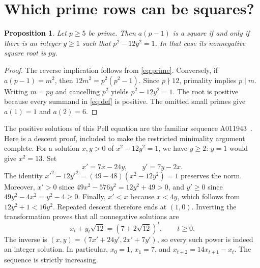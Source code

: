 \documentclass[11pt]{article}
\newtheorem{proposition}[theorem]{Proposition}
\begin{document}
\section{Which prime rows can be squares?}
\begin{proposition}\label{prop:criterion}
Let $p\geq5$ be prime. Then $a(p-1)$ is a square if and only if
there is an integer $y\geq1$ such that $p^2-12y^2=1$.
In that case its nonnegative square root is $py$.
\end{proposition}
\begin{proof}
The reverse implication follows from \eqref{eq:prime}.
Conversely, if $a(p-1)=m^2$, then
$12m^2=p^2(p^2-1)$. Since $p\nmid12$, primality implies $p\mid m$.
Writing $m=py$ and cancelling $p^2$ yields $p^2-12y^2=1$.
The root is positive because every summand in \eqref{eq:def} is
positive. The omitted small primes give $a(1)=1$ and $a(2)=6$.
\end{proof}

The positive solutions of this Pell equation are the familiar
sequence A011943~\cite{lloyd}. Here is a descent proof, included
to make the restricted minimality argument complete.
For a solution $x,y>0$ of $x^2-12y^2=1$, we have $y\geq2$:
$y=1$ would give $x^2=13$. Set
\[
 x'=7x-24y,\qquad y'=7y-2x.
\]
The identity $x'^2-12y'^2=(49-48)(x^2-12y^2)=1$ preserves the norm.
Moreover, $x'>0$ since
$49x^2-576y^2=12y^2+49>0$, and $y'\geq0$ since
$49y^2-4x^2=y^2-4\geq0$.
Finally, $x'<x$ because $x<4y$, which follows from
$12y^2+1<16y^2$. Repeated descent therefore ends at $(1,0)$.
Inverting the transformation proves that all nonnegative solutions are
\begin{equation}\label{eq:pell}
 x_t+y_t\sqrt{12}=(7+2\sqrt{12})^t,\qquad t\geq0.
\end{equation}
The inverse is $(x,y)=(7x'+24y',2x'+7y')$, so every such power
is indeed an integer solution. In particular,
$x_0=1$, $x_1=7$, and $x_{t+2}=14x_{t+1}-x_t$.
The sequence is strictly increasing.
\end{document}
